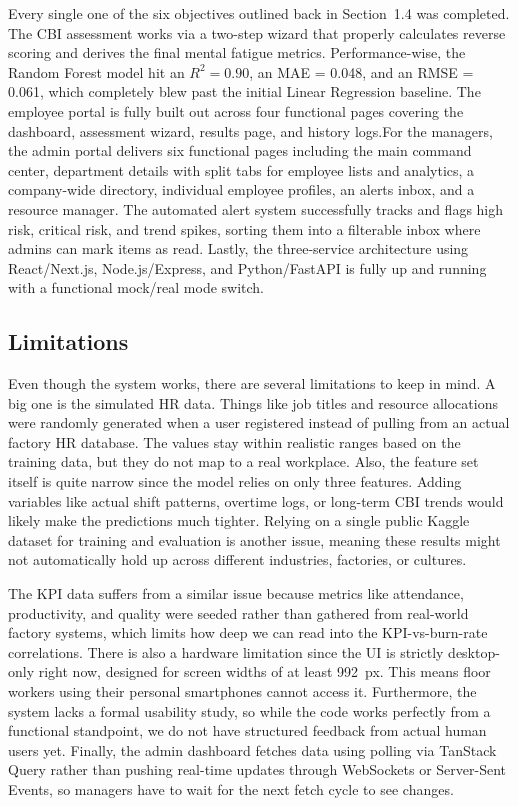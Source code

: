 \documentclass[12pt,a4paper]{article}
\begin{document}
Every single one of the six objectives outlined back in Section~1.4 was completed. The CBI assessment works via a two-step wizard that properly calculates reverse scoring and derives the final mental fatigue metrics. Performance-wise, the Random Forest model hit an $R^{2} = 0.90$, an MAE = 0.048, and an RMSE = 0.061, which completely blew past the initial Linear Regression baseline. The employee portal is fully built out across four functional pages covering the dashboard, assessment wizard, results page, and history logs.For the managers, the admin portal delivers six functional pages including the main command center, department details with split tabs for employee lists and analytics, a company-wide directory, individual employee profiles, an alerts inbox, and a resource manager. The automated alert system successfully tracks and flags high risk, critical risk, and trend spikes, sorting them into a filterable inbox where admins can mark items as read. Lastly, the three-service architecture using React/Next.js, Node.js/Express, and Python/FastAPI is fully up and running with a functional mock/real mode switch.

\subsection{Limitations}
\label{sec:limitations}

Even though the system works, there are several limitations to keep in mind. A big one is the simulated HR data. Things like job titles and resource allocations were randomly generated when a user registered instead of pulling from an actual factory HR database. The values stay within realistic ranges based on the training data, but they do not map to a real workplace. Also, the feature set itself is quite narrow since the model relies on only three features. Adding variables like actual shift patterns, overtime logs, or long-term CBI trends would likely make the predictions much tighter. Relying on a single public Kaggle dataset for training and evaluation is another issue, meaning these results might not automatically hold up across different industries, factories, or cultures.

The KPI data suffers from a similar issue because metrics like attendance, productivity, and quality were seeded rather than gathered from real-world factory systems, which limits how deep we can read into the KPI-vs-burn-rate correlations. There is also a hardware limitation since the UI is strictly desktop-only right now, designed for screen widths of at least 992~px. This means floor workers using their personal smartphones cannot access it. Furthermore, the system lacks a formal usability study, so while the code works perfectly from a functional standpoint, we do not have structured feedback from actual human users yet. Finally, the admin dashboard fetches data using polling via TanStack Query rather than pushing real-time updates through WebSockets or Server-Sent Events, so managers have to wait for the next fetch cycle to see changes.
\end{document}
